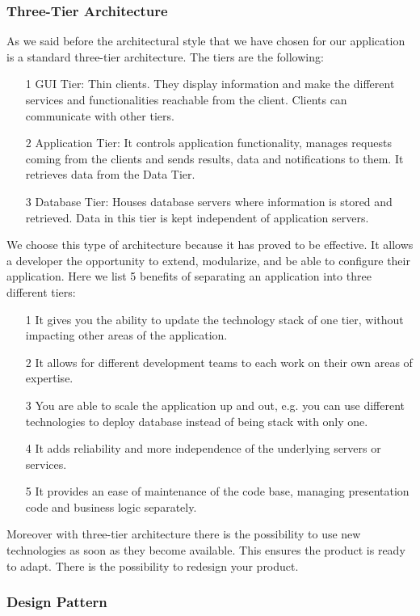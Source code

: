 \documentclass[12pt,titlepage]{article}
\begin{document}
\subsubsection{Three-Tier Architecture} 
As we said before the architectural style that we have chosen for our application is a standard three-tier architecture. The tiers are the following:
\begin{itemize}


\item[1] GUI Tier: Thin clients. They display information and make the different services and functionalities reachable from the client. Clients can communicate with other tiers.
\item[2] Application Tier: It controls application functionality, manages requests coming from the clients and sends results, data and notifications to them. It retrieves data from the Data Tier.
\item[3] Database Tier: Houses database servers where information is stored and retrieved. Data in this tier is kept independent of application servers.
\end{itemize}
We choose this type of architecture because it has proved to be effective. It allows a developer the opportunity to extend, modularize, and be able to configure their application.
Here we list 5 benefits of separating an application into three different tiers:
\begin{itemize}
\item[1] It gives you the ability to update the technology stack of one tier, without impacting other areas of the application.
\item[2] It allows for different development teams to each work on their own areas of expertise.
\item[3] You are able to scale the application up and out, e.g. you can use different technologies to deploy database instead of being stack with only one.
\item[4] It adds reliability and more independence of the underlying servers or services.
\item[5] It provides an ease of maintenance of the code base, managing presentation code and business logic separately.
\end{itemize}
Moreover with three-tier architecture there is the possibility to use new technologies as soon as they become available. This ensures the product is ready to adapt. There is the possibility to redesign your product.
\subsubsection{Design Pattern}
\end{document}
